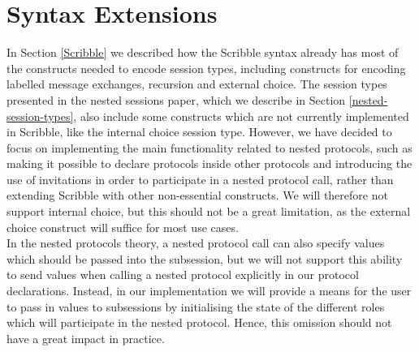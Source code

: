\documentclass[12pt,twoside]{report}
\begin{document}
\section{Syntax Extensions}\label{scribble-extensions}


In Section \ref{Scribble} we described how the Scribble syntax already has most of the constructs needed to encode session types, including constructs for encoding labelled message exchanges, recursion and external choice. The session types presented in the nested sessions paper\cite{nestedprotocols}, which we describe in Section \ref{nested-session-types}, also include some constructs which are not currently implemented in Scribble, like the internal choice session type. However, we have decided to focus on implementing the main functionality related to nested protocols, such as making it possible to declare protocols inside other protocols and introducing the use of invitations in order to participate in a nested protocol call, rather than extending Scribble with other non-essential constructs. We will therefore not support internal choice, but this should not be a great limitation, as the external choice construct will suffice for most use cases.
\\

In the nested protocols theory, a nested protocol call can also specify values which should be passed into the subsession, but we will not support this ability to send values when calling a nested protocol explicitly in our protocol declarations. Instead, in our implementation we will provide a means for the user to pass in values to subsessions by initialising the state of the different roles which will participate in the nested protocol. Hence, this omission should not have a great impact in practice.\\
\end{document}
